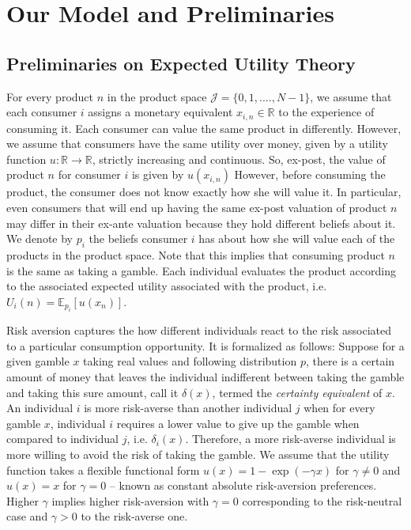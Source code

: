 \documentclass[sigconf, anonymous, review]{acmart}
\begin{document}
\section{Our Model and Preliminaries}

\subsection{Preliminaries on Expected Utility Theory}
\noindent For every product $n$ in the product space $\mathcal J=\{0,1,....,N-1\}$, we assume that each consumer $i$ assigns a monetary equivalent $x_{i,n} \in \mathbb R$ to the experience of consuming it. Each consumer can value the same product in differently. However, we assume that consumers have the same utility over money, given by a utility function $u: \mathbb R \to \mathbb R$, strictly increasing and continuous. So, ex-post, the value of product $n$ for consumer $i$ is given by $u(x_{i,n})$ However, before consuming the product, the consumer does not know exactly how she will value it. In particular, even consumers that will end up having the same ex-post valuation of product $n$ may differ in their ex-ante valuation because they hold different beliefs about it. We denote by $p_{i}$ the beliefs consumer $i$ has about how she will value each of the products in the product space. Note that this implies that consuming product $n$ is the same as taking a gamble. Each individual evaluates the product according to the associated expected utility associated with the product, i.e. $U_i(n)=\mathbb E_{p_i}[u(x_n)]$. 
\par

Risk aversion captures the how different individuals react to the risk associated to a particular consumption opportunity. It is formalized as follows: Suppose for a given gamble $x$ taking real values and following distribution $p$, there is a certain amount of money that leaves the individual indifferent between taking the gamble and taking this sure amount, call it $\delta(x)$, termed the \textit{certainty equivalent} of $x$. An individual $i$ is more risk-averse than another individual $j$ when for every gamble $x$, individual $i$ requires a lower value to give up the gamble when compared to individual $j$, i.e. $\delta_i(x)$. Therefore, a more risk-averse individual is more willing to avoid the risk of taking the gamble. We assume that the utility function takes a flexible functional form $u(x)=1-\exp(-\gamma x)$ for $\gamma\ne0$ and $u(x)=x$ for $\gamma=0$ -- known as constant absolute risk-aversion preferences. Higher $\gamma$ implies higher risk-aversion with $\gamma=0$ corresponding to the risk-neutral case and $\gamma>0$ to the risk-averse one.
\par
\end{document}
